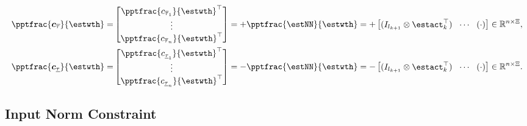 \documentclass[lettersize,journal]{IEEEtran}
\begin{document}
\begin{equation}
    \begin{aligned}
        \pptfrac{\boldsymbol c_{\overline \tau}}{\estwth}
        =& 
        \begin{bmatrix}
            \pptfrac{c_{\overline \tau_1}}{\estwth}^\top \\
            \vdots \\
            \pptfrac{c_{\overline \tau_n}}{\estwth}^\top
        \end{bmatrix}
        = 
            +\pptfrac{\estNN}{\estwth}
        =
        +
        \begin{bmatrix}
            (I_{l_{k+1}}\otimes \estact_{k}^\top)&
            \!\cdots\! &
            (
                \cdot
            )
        \end{bmatrix} 
        \in
        \mathbb R^{n\times \Xi}
        , 
        \\
        \pptfrac{\boldsymbol c_{\underline\tau}}{\estwth}         
        =
        & 
        \begin{bmatrix}
            \pptfrac{c_{\underline\tau_1}}{\estwth}^\top \\
            \vdots \\
            \pptfrac{c_{\underline\tau_n}}{\estwth}^\top
        \end{bmatrix}
        = 
        -\pptfrac{\estNN}{\estwth}
        =
        -\begin{bmatrix}
            (I_{l_{k+1}}\otimes \estact_{k}^\top)&
            \!\cdots\! &
            (
                \cdot
            )
        \end{bmatrix} 
        \in
        \mathbb R^{n\times \Xi}
        .
    \end{aligned}
    \label{eq:cstr:input:bound:grad}
\end{equation}

\subsection{Input Norm Constraint}\label{sec:appen:cstr:input:norm}
\end{document}
